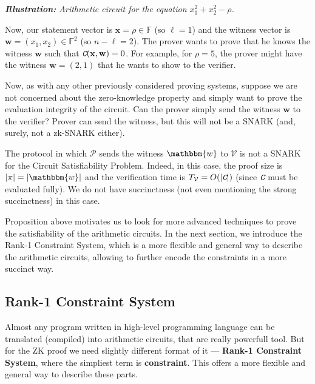 \documentclass[../lecture-notes-148x210.tex]{subfiles}
\begin{document}
\begin{example}
\begin{center}
        \textit{\textbf{Illustration:} Arithmetic circuit for the equation $x_1^2 + x_2^2 - \rho$.}
    \end{center}

    Now, our statement vector is $\mathbf{x} = \rho \in \mathbb{F}$ (so
    $\ell=1$) and the witness vector is $\mathbf{w} = (x_1,x_2) \in
    \mathbb{F}^2$ (so $n-\ell=2$). The prover wants to prove that he knows the
    witness $\mathbf{w}$ such that $\textit{\texttt{C}}(\mathbf{x},\mathbf{w}) = 0$. For
    example, for $\rho=5$, the prover might have the witness $\mathbf{w} =
    (2,1)$ that he wants to show to the verifier.
\end{example}

Now, as with any other previously considered proving systems, suppose we are not concerned about the zero-knowledge property and simply want to prove the evaluation integrity of the circuit. Can the prover simply send the witness $\mathbf{w}$ to the verifier? Prover can send the witness, but this will not be a SNARK (and, surely, not a zk-SNARK either). 

\begin{proposition}
    The protocol in which $\mathcal{P}$ sends the witness $\mathbbm{w}$ to
    $\mathcal{V}$ is not a SNARK for the Circuit Satisfiability Problem. Indeed,
    in this case, the proof size is $|\pi| = |\mathbbm{w}|$ and the verification
    time is $T_{\mathcal{V}} = O(|\textit{\texttt{C}}|)$ (since $\textit{\texttt{C}}$ must be evaluated
    fully). We do not have succinctness (not even mentioning the strong
    succinctness) in this case.
\end{proposition}

Proposition above motivates us to look for more advanced techniques to prove the satisfiability of the arithmetic circuits. In the next section, we introduce the Rank-1 Constraint System, which is a more flexible and general way to describe the arithmetic circuits, allowing to further encode the constraints in a more succinct way.

\subsection{Rank-1 Constraint System}

Almost any program written in high-level programming language can be translated (compiled) into
arithmetic circuits, that are really powerfull tool. But for the ZK proof we need slightly different
format of it --- \textbf{Rank-1 Constraint System}, where the simpliest term is \textbf{constraint}. 
This offers a more flexible and general way to describe these parts.
\end{document}
